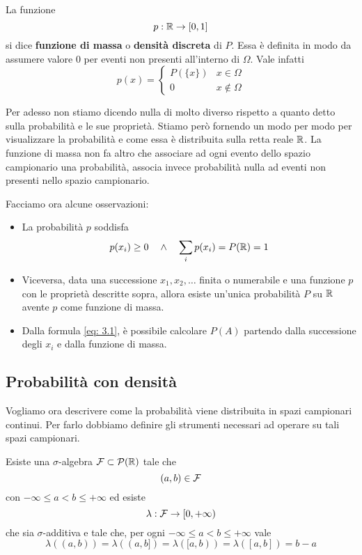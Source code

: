 \begin{definition}
	La funzione
	\[ p : \mathbb{R} \to [0,1] \]
	si dice \textbf{funzione di massa} o \textbf{densità discreta} di $P$. Essa è definita in modo
	da assumere valore 0 per eventi non presenti all'interno di $\Omega$. Vale infatti
	\[
		p(x) = \begin{cases}
			P(\{ x \}) & x \in \Omega    \\[1ex]
			0          & x \notin \Omega
		\end{cases}
	\]
\end{definition}

Per adesso non stiamo dicendo nulla di molto diverso rispetto a quanto detto sulla probabilità e
le sue proprietà. Stiamo però fornendo un modo per modo per visualizzare la probabilità e come
essa è distribuita sulla retta reale $\mathbb{R}$. La funzione di massa non fa altro che associare ad
ogni evento dello spazio campionario una probabilità, associa invece probabilità nulla ad eventi
non presenti nello spazio campionario.

\begin{observation}
	Facciamo ora alcune osservazioni:
	\begin{itemize}
		\item La probabilità $p$ soddisfa
		      \[ p(x_i) \geq 0 \quad \land \quad \sum_i p(x_i) = P(\mathbb{R}) = 1 \]
		\item Viceversa, data una successione $x_1, x_2, \dots$ finita o numerabile e una funzione
		      $p$ con le proprietà descritte sopra, allora esiste un'unica probabilità $P$ su $\mathbb{R}$
		      avente $p$ come funzione di massa.
		\item Dalla formula \ref{eq: 3.1}, è possibile calcolare $P(A)$ partendo dalla successione
		      degli $x_i$ e dalla funzione di massa.
	\end{itemize}
\end{observation}

\subsection{Probabilità con densità}
Vogliamo ora descrivere come la probabilità viene distribuita in spazi campionari continui. Per
farlo dobbiamo definire gli strumenti necessari ad operare su tali spazi campionari.

\begin{theorem}
	Esiste una $\sigma$-algebra $\mathcal{F} \subset \mathcal{P}(\mathbb{R})$ tale che
	\[ (a, b) \in \mathcal{F} \]
	con $-\infty \leq a < b \leq +\infty$ ed esiste
	\[ \lambda : \mathcal{F} \to [0, +\infty) \]
			che sia $\sigma$-additiva e tale che, per ogni $-\infty \leq a < b \leq +\infty$ vale
			\[ \lambda((a,b)) = \lambda((a,b]) = \lambda ([a,b)) = \lambda([a,b]) = b - a \]
\end{theorem}


